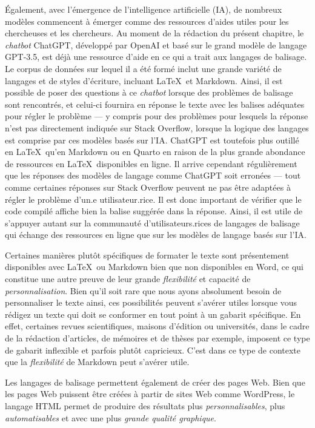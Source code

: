 \documentclass[
  letterpaper,
]{scrbook}
\begin{document}
Également, avec l'émergence de l'intelligence artificielle (IA), de
nombreux modèles commencent à émerger comme des ressources d'aides
utiles pour les chercheuses et les chercheurs. Au moment de la rédaction
du présent chapitre, le \emph{chatbot} ChatGPT, développé par OpenAI et
basé sur le grand modèle de langage GPT-3.5, est déjà une ressource
d'aide en ce qui a trait aux langages de balisage. Le corpus de données
sur lequel il a été formé inclut une grande variété de langages et de
styles d'écriture, incluant \LaTeX~et Markdown. Ainsi, il est possible
de poser des questions à ce \emph{chatbot} lorsque des problèmes de
balisage sont rencontrés, et celui-ci fournira en réponse le texte avec
les balises adéquates pour régler le problème --- y compris pour des
problèmes pour lesquels la réponse n'est pas directement indiquée sur
Stack Overflow, lorsque la logique des langages est comprise par ces
modèles basés sur l'IA. ChatGPT est toutefois plus outillé en
\LaTeX~qu'en Markdown ou en Quarto en raison de la plus grande abondance
de ressources en \LaTeX~disponibles en ligne. Il arrive cependant
régulièrement que les réponses des modèles de langage comme ChatGPT soit
erronées --- tout comme certaines réponses sur Stack Overflow peuvent ne
pas être adaptées à régler le problème d'un.e utilisateur.rice. Il est
donc important de vérifier que le code compilé affiche bien la balise
suggérée dans la réponse. Ainsi, il est utile de s'appuyer autant sur la
communauté d'utilisateurs.rices de langages de balisage qui échange des
ressources en ligne que sur les modèles de langage basés sur l'IA.

Certaines manières plutôt spécifiques de formater le texte sont
présentement disponibles avec \LaTeX~ou Markdown bien que non
disponibles en Word, ce qui constitue une autre preuve de leur grande
\emph{flexibilité} et capacité de \emph{personnalisation}. Bien qu'il
soit rare que nous ayons absolument besoin de personnaliser le texte
ainsi, ces possibilités peuvent s'avérer utiles lorsque vous rédigez un
texte qui doit se conformer en tout point à un gabarit spécifique. En
effet, certaines revues scientifiques, maisons d'édition ou universités,
dans le cadre de la rédaction d'articles, de mémoires et de thèses par
exemple, imposent ce type de gabarit inflexible et parfois plutôt
capricieux. C'est dans ce type de contexte que la \emph{flexibilité} de
Markdown peut s'avérer utile.

Les langages de balisage permettent également de créer des pages Web.
Bien que les pages Web puissent être créées à partir de sites Web comme
WordPress, le langage HTML permet de produire des résultats plus
\emph{personnalisables}, plus \emph{automatisables} et avec une plus
\emph{grande qualité graphique}.
\end{document}

